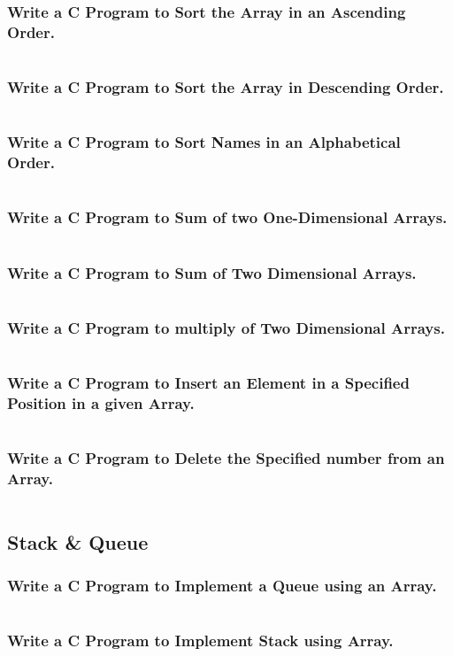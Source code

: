 \documentclass{article}
\begin{document}
\subsubsection{Write a C Program to Sort the Array in an Ascending Order.}
\inputminted{C}{10.c}
\subsubsection{Write a C Program to Sort the Array in Descending Order.}
\inputminted{C}{11.c}
\subsubsection{Write a C Program to Sort Names in an Alphabetical Order.}
\inputminted{C}{12.c}
\subsubsection{Write a C Program to Sum of two One-Dimensional Arrays.}
\inputminted{C}{13.c}
\subsubsection{Write a C Program to Sum of Two Dimensional Arrays.}
\inputminted{C}{14.c}
\subsubsection{Write a C Program to multiply of Two Dimensional Arrays.}
\inputminted{C}{15.c}
\subsubsection{Write a C Program to Insert an Element in a Specified Position in a given Array.}
\inputminted{C}{16.c}
\subsubsection{Write a C Program to Delete the Specified number from an Array.}
\inputminted{C}{17.c}
\subsection{Stack \& Queue}
\subsubsection{Write a C Program to Implement a Queue using an Array.}
\inputminted{C}{18.c}
\subsubsection{Write a C Program to Implement Stack using Array.}
\inputminted{C}{19.c}
\end{document}
